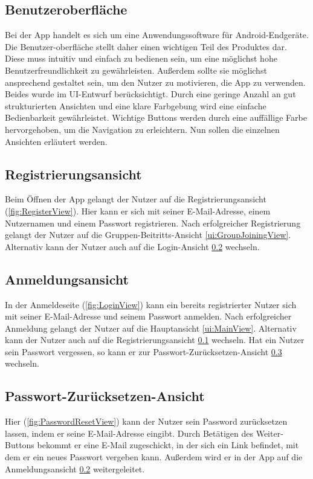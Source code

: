 \documentclass[parskip=full]{scrartcl}
\begin{document}
\subsection*{Benutzeroberfläche}
Bei der App handelt es sich um eine Anwendungssoftware für Android-Endgeräte. Die Benutzer-oberfläche stellt daher einen wichtigen Teil des Produktes dar. Diese muss intuitiv und einfach zu bedienen sein, um eine möglichst hohe Benutzerfreundlichkeit zu gewährleisten. Außerdem sollte sie möglichst ansprechend gestaltet sein, um den Nutzer zu motivieren, die App zu verwenden. Beides wurde im UI-Entwurf berücksichtigt. Durch eine geringe Anzahl an gut strukturierten Ansichten und eine klare Farbgebung wird eine einfache Bedienbarkeit gewährleistet. Wichtige Buttons werden durch eine auffällige Farbe hervorgehoben, um die Navigation zu erleichtern. Nun sollen die einzelnen Ansichten erläutert werden.

\subsection{Registrierungsansicht}
\label{ui:RegisterView}
Beim Öffnen der App gelangt der Nutzer auf die Registrierungsansicht (\autoref{fig:RegisterView}). Hier kann er sich mit seiner E-Mail-Adresse, einem Nutzernamen und einem Passwort registrieren. Nach erfolgreicher Registrierung gelangt der Nutzer auf die Gruppen-Beitritts-Ansicht \ref{ui:GroupJoiningView}. Alternativ kann der Nutzer auch auf die Login-Ansicht \ref{ui:LoginView} wechseln.

\subsection{Anmeldungsansicht}
\label{ui:LoginView}
In der Anmeldeseite (\autoref{fig:LoginView}) kann ein bereits registrierter Nutzer sich mit seiner E-Mail-Adresse und seinem Passwort anmelden. Nach erfolgreicher Anmeldung gelangt der Nutzer auf die Hauptansicht \ref{ui:MainView}. Alternativ kann der Nutzer auch auf die Registrierungsansicht \ref{ui:RegisterView} wechseln.
Hat ein Nutzer sein Passwort vergessen, so kann er zur Passwort-Zurücksetzen-Ansicht \ref{ui:PasswordResetView} wechseln.

\subsection{Passwort-Zurücksetzen-Ansicht}
\label{ui:PasswordResetView}
Hier (\autoref{fig:PasswordResetView}) kann der Nutzer sein Password zurücksetzen lassen, indem er seine E-Mail-Adresse eingibt. Durch Betätigen des Weiter-Buttons bekommt er eine E-Mail zugeschickt, in der sich ein Link befindet, mit dem er ein neues Passwort vergeben kann. Außerdem wird er in der App auf die Anmeldungsansicht \ref{ui:LoginView} weitergeleitet.
\end{document}

